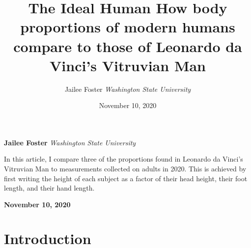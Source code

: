 \documentclass[]{article}
\title{\textbf{\textcolor{WSU.crimson}{The Ideal
Human}} \newline \textbf{\textcolor{WSU.gray}{How body proportions of
modern humans compare to those of Leonardo da Vinci's Vitruvian Man}}  }
\author{\Large Jailee
Foster\vspace{0.05in} \newline\normalsize\emph{Washington State
University}  }
\date{November 10, 2020}
\newcommand*{\authorfont}{\fontfamily{phv}\selectfont}
\renewenvironment{abstract}
 {{%
    \setlength{\leftmargin}{0mm}
    \setlength{\rightmargin}{\leftmargin}%
  }%
  \relax}
 {\endlist}
\begin{document}
	
%    


{%
\setlength{\parindent}{0pt}
\thispagestyle{plain}
{\fontsize{18}{20}\selectfont\raggedright 
\maketitle  %

}

{
   \vskip 13.5pt\relax \normalsize\fontsize{11}{12} 
   
\textbf{\authorfont Jailee Foster} \hskip 15pt \emph{\small Washington
State University}   

}

}








\begin{abstract}

    \hbox{\vrule height .2pt width 39.14pc}

    \vskip 8.5pt %

\noindent In this article, I compare three of the proportions found in
Leonardo da Vinci's Vitruvian Man to measurements collected on adults in
2020. This is achieved by first writing the height of each subject as a
factor of their head height, their foot length, and their hand length.


    



    
    \hbox{\vrule height .2pt width 39.14pc}
    \vskip 5pt 
    \hfill \textbf{\textcolor{WSU.gray}{ November 10, 2020 } }
    \vskip 5pt 
    
\end{abstract}


\vskip -8.5pt




\noindent  

\section{Introduction}
\label{sec:intro}
\end{document}
